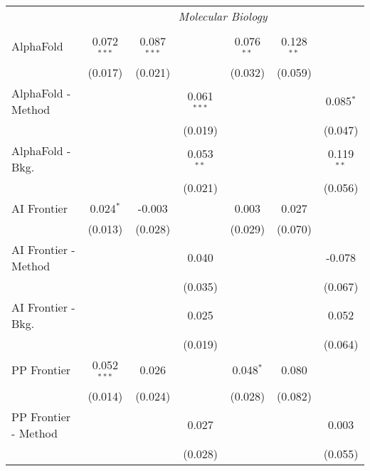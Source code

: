 \begin{tabular}{lcccccc}
 & \multicolumn{6}{c}{\textit{Molecular Biology}} \\ \\
   AlphaFold            & 0.072$^{***}$ & 0.087$^{***}$ &               & 0.076$^{**}$ & 0.128$^{**}$ &   \\   
                        & (0.017)       & (0.021)       &               & (0.032)      & (0.059)      &   \\   
   AlphaFold - Method   &               &               & 0.061$^{***}$ &              &              & 0.085$^{*}$\\   
                        &               &               & (0.019)       &              &              & (0.047)\\   
   AlphaFold - Bkg.     &               &               & 0.053$^{**}$  &              &              & 0.119$^{**}$\\   
                        &               &               & (0.021)       &              &              & (0.056)\\   
   AI Frontier          & 0.024$^{*}$   & -0.003        &               & 0.003        & 0.027        &   \\   
                        & (0.013)       & (0.028)       &               & (0.029)      & (0.070)      &   \\   
   AI Frontier - Method &               &               & 0.040         &              &              & -0.078\\   
                        &               &               & (0.035)       &              &              & (0.067)\\   
   AI Frontier - Bkg.   &               &               & 0.025         &              &              & 0.052\\   
                        &               &               & (0.019)       &              &              & (0.064)\\   
   PP Frontier          & 0.052$^{***}$ & 0.026         &               & 0.048$^{*}$  & 0.080        &   \\   
                        & (0.014)       & (0.024)       &               & (0.028)      & (0.082)      &   \\   
   PP Frontier - Method &               &               & 0.027         &              &              & 0.003\\   
                        &               &               & (0.028)       &              &              & (0.055)\\   

\end{tabular}
